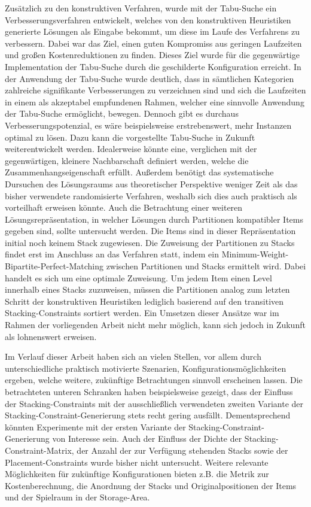 Zusätzlich zu den konstruktiven Verfahren, wurde mit der Tabu-Suche ein Verbesserungsverfahren entwickelt,
welches von den konstruktiven Heuristiken generierte Lösungen als Eingabe bekommt, um diese
im Laufe des Verfahrens zu verbessern. Dabei war das Ziel, einen guten Kompromiss aus geringen Laufzeiten
und großen Kostenreduktionen zu finden. Dieses Ziel wurde für die gegenwärtige Implementation der Tabu-Suche durch die geschilderte Konfiguration erreicht. In der Anwendung der Tabu-Suche wurde deutlich, dass in sämtlichen Kategorien zahlreiche signifikante Verbesserungen zu verzeichnen sind und sich die Laufzeiten in einem als akzeptabel empfundenen Rahmen, welcher eine sinnvolle Anwendung der Tabu-Suche ermöglicht, bewegen.
Dennoch gibt es durchaus Verbesserungspotenzial, es wäre beispielsweise erstrebenswert,
mehr Instanzen optimal zu lösen. Dazu kann die vorgestellte Tabu-Suche in Zukunft weiterentwickelt werden.
Idealerweise könnte eine, verglichen mit der gegenwärtigen, kleinere Nachbarschaft definiert werden, welche die Zusammenhangseigenschaft erfüllt.
Außerdem benötigt das systematische Dursuchen des Lösungsraums aus theoretischer Perspektive weniger Zeit
als das bisher verwendete randomisierte Verfahren, weshalb sich dies auch praktisch als vorteilhaft erweisen könnte.
Auch die Betrachtung einer weiteren Lösungsrepräsentation, in welcher Lösungen durch Partitionen kompatibler Items
gegeben sind, sollte untersucht werden. Die Items sind in dieser Repräsentation initial noch
keinem Stack zugewiesen. Die Zuweisung der Partitionen zu Stacks findet erst im Anschluss an das Verfahren statt, indem ein Minimum-Weight-Bipartite-Perfect-Matching zwischen Partitionen und Stacks ermittelt wird. Dabei handelt es sich um eine optimale Zuweisung. Um jedem Item einen Level innerhalb eines Stacks zuzuweisen, müssen die Partitionen
analog zum letzten Schritt der konstruktiven Heuristiken lediglich basierend auf den transitiven Stacking-Constraints
sortiert werden. Ein Umsetzen dieser Ansätze war im Rahmen der vorliegenden Arbeit nicht mehr möglich, kann sich
jedoch in Zukunft als lohnenswert erweisen.

Im Verlauf dieser Arbeit haben sich an vielen Stellen, vor allem durch unterschiedliche praktisch motivierte Szenarien, Konfigurationsmöglichkeiten ergeben, welche weitere, zukünftige Betrachtungen sinnvoll erscheinen lassen.
Die betrachteten unteren Schranken haben beispielsweise gezeigt, dass der Einfluss der Stacking-Constraints mit der ausschließlich verwendeten zweiten Variante der Stacking-Constraint-Generierung stets recht gering ausfällt. Dementsprechend könnten Experimente mit der ersten Variante der Stacking-Constraint-Generierung von Interesse sein.
Auch der Einfluss der Dichte der Stacking-Constraint-Matrix, der Anzahl der zur Verfügung stehenden Stacks sowie der Placement-Constraints wurde bisher nicht untersucht. Weitere relevante Möglichkeiten für zukünftige Konfigurationen bieten z.B. die Metrik zur Kostenberechnung, die Anordnung der Stacks und Originalpositionen der Items und der Spielraum in der Storage-Area.

